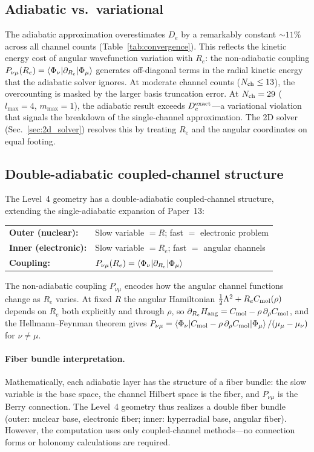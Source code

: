 \documentclass[aps,pra,twocolumn,superscriptaddress,longbibliography]{revtex4-2}
\begin{document}
\subsection{Adiabatic vs.\ variational}

The adiabatic approximation overestimates $D_e$ by a remarkably
constant ${\sim}11\%$ across all channel counts
(Table~\ref{tab:convergence}).  This reflects the kinetic energy cost
of angular wavefunction variation with $R_e$: the non-adiabatic
coupling $P_{\nu\mu}(R_e) =
\braket{\Phi_\nu|\partial_{R_e}|\Phi_\mu}$ generates off-diagonal
terms in the radial kinetic energy that the adiabatic solver ignores.
At moderate channel counts ($N_{\rm ch} \le 13$), the overcounting is
masked by the larger basis truncation error.  At $N_{\rm ch} = 29$
($l_{\max}=4$, $m_{\max}=1$), the adiabatic result exceeds
$D_e^{\rm exact}$---a variational violation that signals the
breakdown of the single-channel approximation.
The 2D solver (Sec.~\ref{sec:2d_solver}) resolves this by treating
$R_e$ and the angular coordinates on equal footing.

\subsection{Double-adiabatic coupled-channel structure}

The Level~4 geometry has a double-adiabatic coupled-channel structure,
extending the single-adiabatic expansion of Paper~13:

\medskip
\noindent
\begin{tabular}{ll}
\textbf{Outer (nuclear):} & Slow variable $= R$;
  fast $=$ electronic problem \\
\textbf{Inner (electronic):} & Slow variable $= R_e$;
  fast $=$ angular channels \\
\textbf{Coupling:} & $P_{\nu\mu}(R_e) =
  \braket{\Phi_\nu|\partial_{R_e}|\Phi_\mu}$
\end{tabular}

\medskip
\noindent
The non-adiabatic coupling $P_{\nu\mu}$ encodes how the angular
channel functions change as $R_e$ varies.  At fixed $R$ the angular
Hamiltonian $\tfrac12\Lambda^2 + R_e C_{\rm mol}(\rho)$ depends on
$R_e$ both explicitly and through $\rho$, so
$\partial_{R_e} H_{\rm ang} = C_{\rm mol} - \rho\,\partial_\rho C_{\rm mol}$,
and the Hellmann--Feynman theorem gives
$P_{\nu\mu} = \braket{\Phi_\nu|C_{\rm mol} - \rho\,\partial_\rho C_{\rm mol}|\Phi_\mu}
/(\mu_\mu - \mu_\nu)$ for $\nu \ne \mu$.

\paragraph{Fiber bundle interpretation.}
Mathematically, each adiabatic layer has the structure of a fiber
bundle: the slow variable is the base space, the channel Hilbert
space is the fiber, and $P_{\nu\mu}$ is the Berry connection.  The
Level~4 geometry thus realizes a double fiber bundle (outer: nuclear
base, electronic fiber; inner: hyperradial base, angular fiber).
However, the computation uses only coupled-channel methods---no
connection forms or holonomy calculations are required.
\end{document}
